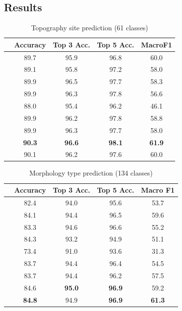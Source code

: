 \subsection{Results}
\begin{table}
  \centering
  \caption{Topography site prediction (61 classes)}
  \label{tab:results2site}
  \begin{tabular}{ccccc}
    \hline
    &Accuracy&Top 3 Acc.&Top 5 Acc.&MacroF1\\
    \hline
    \svm{}     &89.7&95.9&96.8&60.0\\
    \xgb{}     &89.1&95.8&97.2&58.0\\
    \hline
    \gru{}     &89.9&96.5&97.7&58.3\\
    \bert{}    &89.9&96.3&97.8&56.6\\
    \hline
    \maxi{}    &88.0&95.4&96.2&46.1\\
    \maxh{}    &89.9&96.2&97.8&58.8\\
    \softmaxh{}&89.9&96.3&97.7&58.0\\
    \maxp{}    &\textbf{90.3}&\textbf{96.6}&\textbf{98.1}&\textbf{61.9}\\
    \softmax{} &90.1&96.2&97.6&60.0\\
    \hline
  \end{tabular}
\end{table}
\begin{table}
  \centering
  \caption{Morphology type prediction (134 classes)}
  \label{tab:results2morpho}
  \begin{tabular}{ccccc}
    \hline
    &Accuracy&Top 3 Acc.&Top 5 Acc.&Macro F1\\
    \hline
    \svm{}     &82.4&94.0&95.6&53.7\\
    \xgb{}     &84.1&94.4&96.5&59.6\\
    \hline
    \gru{}     &83.3&94.6&96.6&55.2\\
    \bert{}    &84.3&93.2&94.9&51.1\\    
    \hline
    \maxi{}    &73.4&91.0&93.6&31.3\\
    \maxh{}    &83.7&94.4&96.4&54.5\\
    \softmaxh{}&83.7&94.4&96.2&57.5\\
    \maxp{}    &84.6&\textbf{95.0}&\textbf{96.9}&59.2\\
    \softmax{} &\textbf{84.8}&94.9&\textbf{96.9}&\textbf{61.3}\\
    \hline
  \end{tabular}
\end{table}
